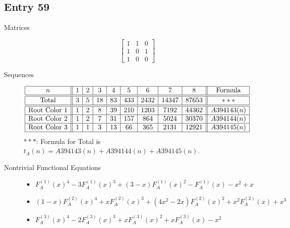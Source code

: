 \documentclass[12pt]{amsart}
\newcommand{\gff}[2]{F_{#2}^{(#1)}(x)}
\newcommand{\gfa}[1]{\gff{#1}{A}}
\begin{document}
\subsection*{Entry 59}
\begin{description}
    \item[Matrices]
    
    \[\begin{bmatrix}
1 & 1 & 0 \\
1 & 0 & 1 \\
1 & 0 & 0
\end{bmatrix}\]
    \item[Sequences]\hspace*{\fill}\vspace{-0.5cm}
    \begin{center}
        \[
        \begin{array}{|c||c|c|c|c|c|c|c|c||c|}\hline
           n  & 1 & 2 & 3 & 4 & 5 & 6 & 7 & 8  & \text{Formula}\\\hline\hline
           \text{Total}  & 3 & 5 & 18 & 83 & 433 & 2432 & 14347 & 87653 & *** \\\hline\hline
           \text{Root Color }1 & 1 & 2 & 8 & 39 & 210 & 1203 & 7192 & 44362 & A394143(n)\\\hline
           \text{Root Color }2 & 1 & 2 & 7 & 31 & 157 & 864 & 5024 & 30370 & A394144(n)\\\hline
           \text{Root Color }3 & 1 & 1 & 3 & 13 & 66 & 365 & 2131 & 12921 & A394145(n) \\\hline
        \end{array}
        \]
        $***$: Formula for Total is $t_A(n)=A394143(n)+A394144(n)+A394145(n)$.
    \end{center}
    
    \item[Nontrivial Functional Equations]\hspace*{\fill}

    \begin{itemize}
\item $\gfa{1}^4-3\gfa{1}^3+(3 - x)\gfa{1}^2-\gfa{1}-x^2 + x$

\item $(1 - x)\gfa{2}^4+x\gfa{2}^3+(4x^2 - 2x)\gfa{2}^2+x^2\gfa{2}+x^3$

\item $\gfa{3}^4-2\gfa{3}^3+x\gfa{3}^2+x\gfa{3}-x^2$


\end{itemize}
    
\end{description}
\end{document}
